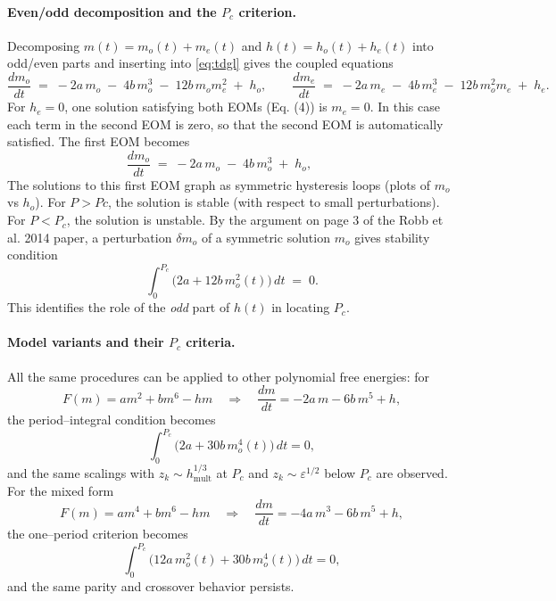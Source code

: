 \documentclass{article}
\begin{document}
\paragraph{Even/odd decomposition and the $P_c$ criterion.}
Decomposing $m(t)=m_o(t)+m_e(t)$ and $h(t)=h_o(t)+h_e(t)$ into odd/even parts and inserting into \eqref{eq:tdgl} gives the coupled equations
\begin{equation}
  \frac{dm_o}{dt} \;=\; -2a\,m_o \;-\; 4b\,m_o^3 \;-\; 12b\,m_o m_e^2 \;+\; h_o,\qquad
  \frac{dm_e}{dt} \;=\; -2a\,m_e \;-\; 4b\,m_e^3 \;-\; 12b\,m_o^2 m_e \;+\; h_e.
  \label{eq:odd_even_eom}
\end{equation}
For $h_e= 0$, one solution satisfying both EOMs (Eq. (4)) is $m_e=0$. In this case each term in the second EOM is zero,
so that the second EOM is automatically satisfied. The first EOM becomes 
\begin{equation}
  \frac{dm_o}{dt} \;=\; -2a\,m_o \;-\; 4b\,m_o^3  \;+\; h_o,\qquad
\end{equation}
The solutions to this first EOM graph as symmetric hysteresis loops (plots of $m_o$ vs $h_o$). For $P >Pc$, the solution is stable
(with respect to small perturbations). For $P < P_c$, the solution is unstable. By the argument on page 3 of the Robb et al. 2014 paper, a
perturbation $\delta m_o$ of a symmetric solution $m_o$ gives stability condition
\begin{equation}
  \int_0^{P_c} \!\bigl(2a+12b\,m_o^2(t)\bigr)\,dt \;=\; 0.
  \label{eq:Pc_def_quartic}
\end{equation}
This identifies the role of the \emph{odd} part of $h(t)$ in locating $P_c$.

\paragraph{Model variants and their $P_c$ criteria.}
All the same procedures can be applied to other polynomial free energies: for
\begin{equation}
  F(m)=a m^2 + b m^6 - h m \quad\Rightarrow\quad \frac{dm}{dt} = -2a\,m - 6b\,m^5 + h ,
\end{equation}
the period–integral condition becomes
\begin{equation}
  \int_0^{P_c} \!\bigl(2a + 30b\,m_o^4(t)\bigr)\,dt = 0,
  \label{eq:Pc_m6}
\end{equation}
and the same scalings with $z_k\sim h_{\mathrm{mult}}^{1/3}$ at $P_c$ and $z_k\sim \varepsilon^{1/2}$ below $P_c$ are observed.
For the mixed form
\begin{equation}
  F(m)=a m^4 + b m^6 - h m \quad\Rightarrow\quad \frac{dm}{dt} = -4a\,m^3 - 6b\,m^5 + h ,
\end{equation}
the one–period criterion becomes
\begin{equation}
  \int_0^{P_c} \!\bigl(12a\,m_o^2(t) + 30b\,m_o^4(t)\bigr)\,dt = 0,
  \label{eq:Pc_m4m6}
\end{equation}
and the same parity and crossover behavior persists.
\end{document}
